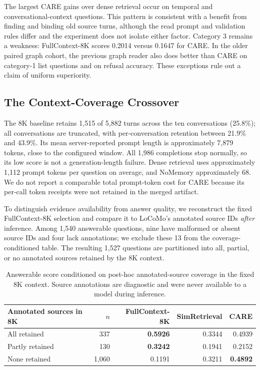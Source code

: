 \documentclass[11pt]{article}
\newcommand{\care}{\textsc{CARE}}
\begin{document}
The largest \care{} gains over dense retrieval occur on temporal and
conversational-context questions. This pattern is consistent with a benefit
from finding and binding old source turns, although the read prompt and
validation rules differ and the experiment does not isolate either factor.
Category 3 remains a weakness: FullContext-8K scores 0.2014 versus 0.1647
for \care{}. In the older paired graph cohort, the previous graph reader
also does better than \care{} on category-1 list questions and on refusal
accuracy. These exceptions rule out a claim of uniform superiority.

\subsection{The Context-Coverage Crossover}

The 8K baseline retains 1,515 of 5,882 turns across the ten conversations
(25.8\%); all conversations are truncated, with per-conversation retention
between 21.9\% and 43.9\%. Its mean server-reported prompt length is
approximately 7,879 tokens, close to the configured window. All 1,986
completions stop normally, so its low score is not a generation-length
failure. Dense retrieval uses approximately 1,112 prompt tokens per
question on average, and NoMemory approximately 68. We do not report a
comparable total prompt-token cost for \care{} because its per-call token
receipts were not retained in the merged artifact.

To distinguish evidence availability from answer quality, we reconstruct
the fixed FullContext-8K selection and compare it to LoCoMo's annotated
source IDs \emph{after} inference. Among 1,540 answerable questions, nine
have malformed or absent source IDs and four lack annotations; we exclude
these 13 from the coverage-conditioned table. The resulting 1,527
questions are partitioned into all, partial, or no annotated sources
retained by the 8K context.

\begin{table}[t]
\centering
\caption{Answerable score conditioned on post-hoc annotated-source
coverage in the fixed 8K context. Source annotations are diagnostic and
were never available to a model during inference.}
\label{tab:coverage}
\small
\begin{tabular}{lrrrr}
\toprule
Annotated sources in 8K & $n$ & FullContext-8K & SimRetrieval & \care{} \\
\midrule
All retained & 337 & \textbf{0.5926} & 0.3344 & 0.4939 \\
Partly retained & 130 & \textbf{0.3242} & 0.1941 & 0.2152 \\
None retained & 1,060 & 0.1191 & 0.3211 & \textbf{0.4892} \\
\bottomrule
\end{tabular}
\end{table}
\end{document}
